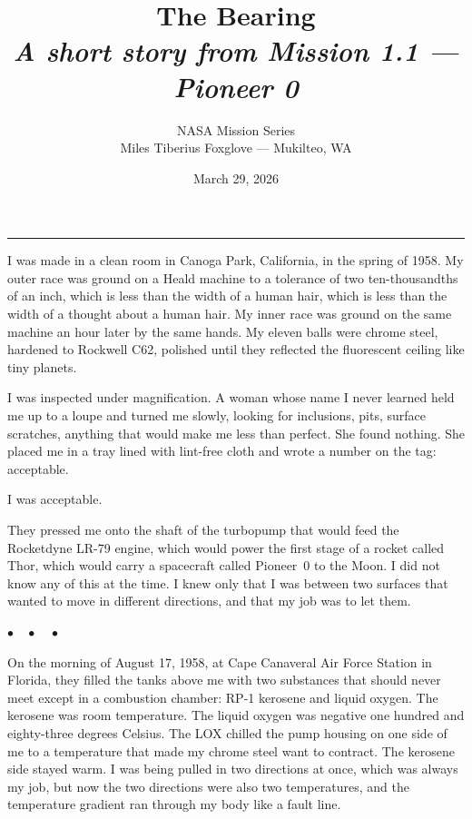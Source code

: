 \documentclass[12pt, letterpaper]{article}
\title{\Huge\textbf{The Bearing}\\[0.5em]\large\textit{A short story from Mission 1.1 --- Pioneer 0}}
\author{NASA Mission Series\\[0.3em]\small Miles Tiberius Foxglove --- Mukilteo, WA}
\date{March 29, 2026}
\begin{document}
\maketitle
\thispagestyle{empty}

\vspace{1em}
\noindent\rule{\textwidth}{0.4pt}
\vspace{1em}

\noindent I was made in a clean room in Canoga Park, California, in the spring of 1958. My outer race was ground on a Heald machine to a tolerance of two ten-thousandths of an inch, which is less than the width of a human hair, which is less than the width of a thought about a human hair. My inner race was ground on the same machine an hour later by the same hands. My eleven balls were chrome steel, hardened to Rockwell C62, polished until they reflected the fluorescent ceiling like tiny planets.

I was inspected under magnification. A woman whose name I never learned held me up to a loupe and turned me slowly, looking for inclusions, pits, surface scratches, anything that would make me less than perfect. She found nothing. She placed me in a tray lined with lint-free cloth and wrote a number on the tag: acceptable.

I was acceptable.

They pressed me onto the shaft of the turbopump that would feed the Rocketdyne LR-79 engine, which would power the first stage of a rocket called Thor, which would carry a spacecraft called Pioneer~0 to the Moon. I did not know any of this at the time. I knew only that I was between two surfaces that wanted to move in different directions, and that my job was to let them.

\begin{center}
$\bullet\quad\bullet\quad\bullet$
\end{center}

On the morning of August 17, 1958, at Cape Canaveral Air Force Station in Florida, they filled the tanks above me with two substances that should never meet except in a combustion chamber: RP-1 kerosene and liquid oxygen. The kerosene was room temperature. The liquid oxygen was negative one hundred and eighty-three degrees Celsius. The LOX chilled the pump housing on one side of me to a temperature that made my chrome steel want to contract. The kerosene side stayed warm. I was being pulled in two directions at once, which was always my job, but now the two directions were also two temperatures, and the temperature gradient ran through my body like a fault line.
\end{document}
